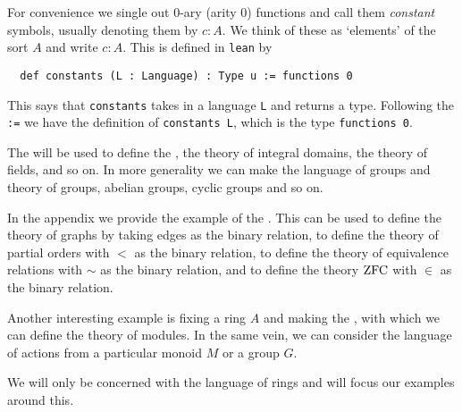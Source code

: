 \begin{dfn}[Language]
  For convenience we single out $0$-ary (arity $0$) functions and
  call them \textit{constant} symbols, usually denoting them by $c : A$.
  We think of these as `elements' of the sort $A$ and write $c : A$.
  This is defined in \texttt{lean} by

  \begin{lstlisting}
  def constants (L : Language) : Type u := functions 0\end{lstlisting}

  This says that \texttt{constants} takes in a language \texttt{L} and returns a type.
  Following the \texttt{:=} we have the definition of \texttt{constants L},
  which is the type \texttt{functions 0}.
\end{dfn}

\begin{eg}
  The 
  will be used to define the ,
  the theory of integral domains, the theory of fields, and so on.
  In more generality we can make the language of groups and
  theory of groups, abelian groups, cyclic groups and so on.

  In the appendix we provide the example of the
  .
  This can be used to define the theory of graphs by taking edges as the binary relation,
  to define the theory of partial orders with $<$ as the binary relation,
  to define the theory of equivalence relations with $\sim$ as the binary relation,
  and to define the theory $\operatorname{ZFC}$ with $\in$ as the binary relation.

  Another interesting example is fixing a ring $A$ and making
  the ,
  with which we can define the theory of modules.
  In the same vein, we can consider the language of actions from
  a particular monoid $M$ or a group $G$.
\end{eg}

We will only be concerned with the language of rings and will
focus our examples around this.


